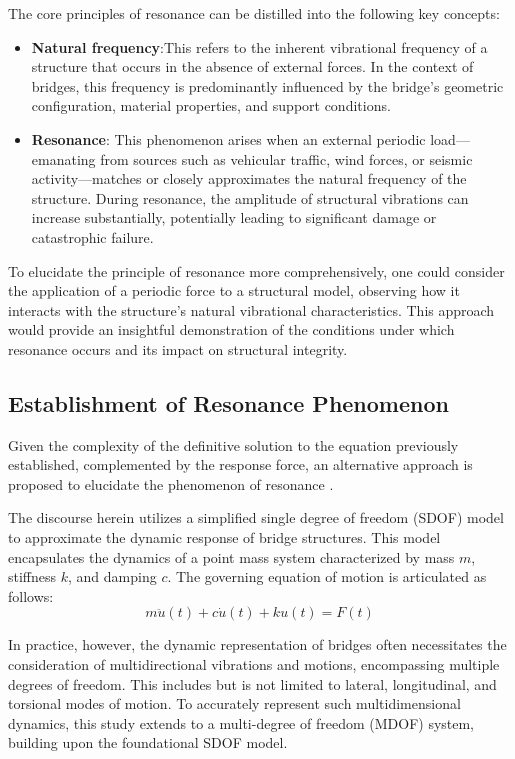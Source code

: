 \documentclass[conference]{IEEEtran}
\begin{document}
The core principles of resonance can be distilled into the following key concepts:
\begin{itemize}
    \item \textbf{Natural frequency}:This refers to the inherent vibrational frequency of a structure that occurs in the absence of external forces. In the context of bridges, this frequency is predominantly influenced by the bridge’s geometric configuration, material properties, and support conditions.
    \item \textbf{Resonance}: This phenomenon arises when an external periodic load—emanating from sources such as vehicular traffic, wind forces, or seismic activity—matches or closely approximates the natural frequency of the structure. During resonance, the amplitude of structural vibrations can increase substantially, potentially leading to significant damage or catastrophic failure.
\end{itemize}

To elucidate the principle of resonance more comprehensively, one could consider the application of a periodic force to a structural model, observing how it interacts with the structure's natural vibrational characteristics. This approach would provide an insightful demonstration of the conditions under which resonance occurs and its impact on structural integrity.

\subsection{Establishment of Resonance Phenomenon}
Given the complexity of the definitive solution to the equation previously established, complemented by the response force, an alternative approach is proposed to elucidate the phenomenon of resonance \cite{wei2023modification}.

The discourse herein utilizes a simplified single degree of freedom (SDOF) model to approximate the dynamic response of bridge structures. This model encapsulates the dynamics of a point mass system characterized by mass \( m \), stiffness \( k \), and damping \( c \). The governing equation of motion is articulated as follows:
\begin{equation}
m\ddot{u}(t) + c\dot{u}(t) + ku(t) = F(t)
\end{equation}

In practice, however, the dynamic representation of bridges often necessitates the consideration of multidirectional vibrations and motions, encompassing multiple degrees of freedom. This includes but is not limited to lateral, longitudinal, and torsional modes of motion. To accurately represent such multidimensional dynamics, this study extends to a multi-degree of freedom (MDOF) system, building upon the foundational SDOF model.
\end{document}
